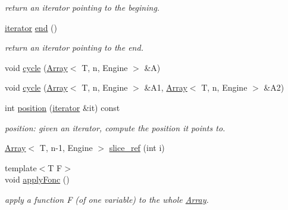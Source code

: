 \begin{DoxyCompactItemize}
\begin{DoxyCompactList}\small\item\em return an iterator pointing to the begining. \end{DoxyCompactList}\item 
\hyperlink{classArrays_1_1Array_abbad078205d9e12b2aedc8599372edf1}{iterator} \hyperlink{classArrays_1_1Array_acb63817c9925336fa0cd6be56f292cd8}{end} ()
\begin{DoxyCompactList}\small\item\em return an iterator pointing to the end. \end{DoxyCompactList}\item 
void \hyperlink{classArrays_1_1Array_a92e344ea0eef34bc930ab30b43081e4b}{cycle} (\hyperlink{classArrays_1_1Array}{Array}$<$ T, n, Engine $>$ \&A)
\item 
void \hyperlink{classArrays_1_1Array_a0bf93587e563b5586029b7ff50df4f91}{cycle} (\hyperlink{classArrays_1_1Array}{Array}$<$ T, n, Engine $>$ \&A1, \hyperlink{classArrays_1_1Array}{Array}$<$ T, n, Engine $>$ \&A2)
\item 
int \hyperlink{classArrays_1_1Array_a4a68b97148668390ad1025ac4611391b}{position} (\hyperlink{classArrays_1_1Array_abbad078205d9e12b2aedc8599372edf1}{iterator} \&it) const 
\begin{DoxyCompactList}\small\item\em position\+: given an iterator, compute the position it points to. \end{DoxyCompactList}\item 
\hyperlink{classArrays_1_1Array}{Array}$<$ T, n-\/1, Engine $>$ \hyperlink{classArrays_1_1Array_a09b151a432b2cda42bb913e7d3ab8491}{slice\+\_\+ref} (int i)
\item 
{\footnotesize template$<$T  F$>$ }\\void \hyperlink{classArrays_1_1Array_a8a6ef2b562271ccee4edfcf58a6a9544}{apply\+Fonc} ()
\begin{DoxyCompactList}\small\item\em apply a function F (of one variable) to the whole \hyperlink{classArrays_1_1Array}{Array}. \end{DoxyCompactList}\end{DoxyCompactItemize}
